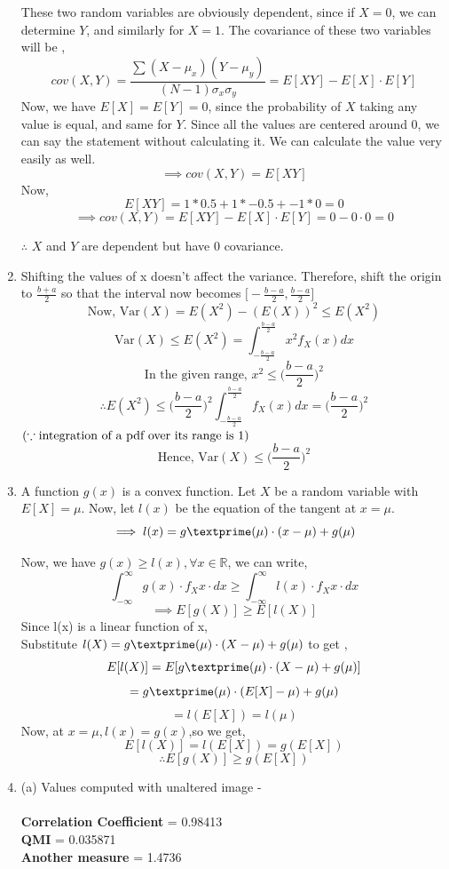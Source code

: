 \documentclass[11pt]{article}
\begin{document}
\begin{enumerate}
{		These two random variables are obviously dependent, since if $X=0$, we can determine $Y$, and similarly for $X=1$.
		The covariance of these two variables will be ,
		$$cov(X,Y) = \frac{ \sum{(X-\mu_x)(Y-\mu_y)}}{(N-1)\sigma_x\sigma_y} = E[XY]-E[X]\cdot E[Y] $$
		Now, we have $E[X] = E[Y] = 0$, since the probability of $X$ taking any value is equal, and same for $Y$. Since all the values are centered around 0, we can say the statement without calculating it. We can calculate the value very easily as well. 
		$$\implies cov(X,Y) = E[XY] $$
		Now,
		$$ E[XY] = 1*0.5 + 1*-0.5 + -1*0  = 0 $$
		$$ \implies cov(X,Y) = E[XY] - E[X]\cdot E[Y] = 0-0\cdot0 = 0$$
		\begin{center}
			$\therefore$ $X$ and $Y$ are dependent but have 0 covariance.
		\end{center}
	}

	\item{
		Shifting the values of x doesn't affect the variance. Therefore, shift the origin to $\frac{b+a}{2}$ so that the interval now becomes $\Big[-\frac{b-a}{2},\frac{b-a}{2}\Big]$\\
        $$\text{Now, Var}(X) = E(X^2) - (E(X))^2 \leq E(X^2)$$
        $$\text{Var}(X) \leq E(X^2) = \int_{-\frac{b-a}{2}}^{\frac{b-a}{2}}x^2f_X(x)dx$$
        $$\text{In the given range,  } x^2 \leq \bigg(\frac{b-a}{2}\bigg)^2$$
        $$\therefore E(X^2) \leq \bigg(\frac{b-a}{2}\bigg)^2\int_{-\frac{b-a}{2}}^{\frac{b-a}{2}}f_X(x)dx = \bigg(\frac{b-a}{2}\bigg)^2$$ $\hfill{(\because \text{integration of a pdf over its range is 1})}$
        $$\text{Hence, Var}(X) \leq \bigg(\frac{b-a}{2}\bigg)^2$$
	}

	\item{
		A function $g(x)$ is a convex function.
		Let $X$ be a random variable with $E[X]=\mu$. 
		Now, let $l(x)$ be the equation of the tangent at $x=\mu$.
		$$\implies l(x) = g\textprime(\mu)\cdot(x-\mu) + g(\mu)$$

		Now, we have $g(x) \geq l(x) ,\forall x \in \mathbb{R} $, we can write, 
		$$\int_{-\infty}^{\infty}{g(x)\cdot f_X{x}\cdot dx} \geq \int_{-\infty}^{\infty}{l(x)\cdot f_X{x}\cdot dx} $$
		$$\implies E[g(X)] \geq E[l(X)]$$
		Since l(x) is a linear function of x, \\
		Substitute $l(X) = g\textprime(\mu)\cdot(X-\mu) + g(\mu)$ to get ,
		$$E[l(X)] = E[g\textprime(\mu)\cdot(X-\mu) + g(\mu)]$$
		$$ = g\textprime(\mu)\cdot(E[X]-\mu) + g(\mu)$$
		$$ = l(E[X]) = l(\mu)$$
		Now, at $x=\mu, l(x) = g(x)$,so we get,
		$$E[l(X)] = l(E[X]) = g(E[X]) $$
		$$ \therefore E[g(X)] \geq g(E[X]) $$
	}
	\newpage
	\item{
		(a) Values computed with unaltered image - \\ \\
		\textbf{Correlation Coefficient} = 0.98413 \\
		\textbf{QMI} = 0.035871 \\
		\textbf{Another measure} = 1.4736 \\

}
\end{enumerate}
\end{document}
